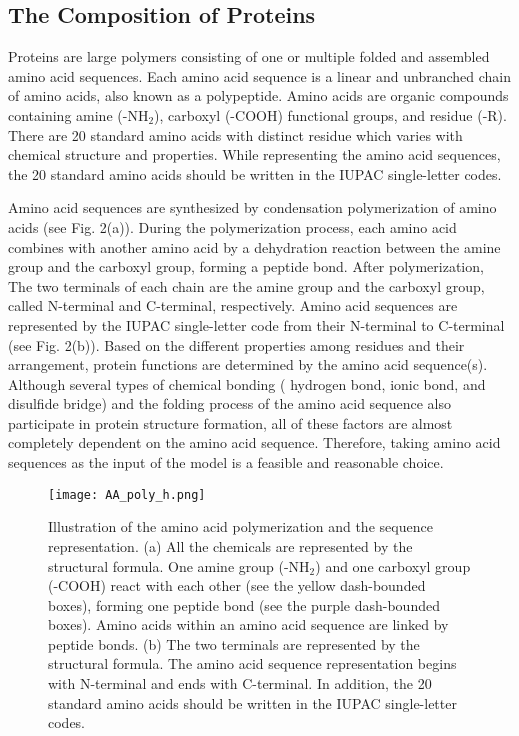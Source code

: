 \documentclass{article}
\begin{document}
    \subsection{The Composition of Proteins}
        Proteins are large polymers consisting of one or multiple folded and assembled amino acid sequences. Each amino acid sequence is a linear and unbranched chain of amino acids, also known as a polypeptide. Amino acids are organic compounds containing amine (-NH$_{2}$), carboxyl (-COOH) functional groups, and residue (-R). There are 20 standard amino acids with distinct residue which varies with chemical structure and properties. While representing the amino acid sequences, the 20 standard amino acids should be written in the IUPAC single-letter codes.  \par
        Amino acid sequences are synthesized by condensation polymerization of amino acids (see Fig. 2(a)). During the polymerization process, each amino acid combines with another amino acid by a dehydration reaction between the amine group and the carboxyl group, forming a peptide bond. After polymerization, The two terminals of each chain are the amine group and the carboxyl group, called N-terminal and C-terminal, respectively. Amino acid sequences are represented by the IUPAC single-letter code from their N-terminal to C-terminal (see Fig. 2(b)). Based on the different properties among residues and their arrangement, protein functions are determined by the amino acid sequence(s). Although several types of chemical bonding ( hydrogen bond, ionic bond, and disulfide bridge)  and the folding process of the amino acid sequence also participate in protein structure formation, all of these factors are almost completely dependent on the amino acid sequence. Therefore, taking amino acid sequences as the input of the model is a feasible and reasonable choice.
        
        \begin{figure}[h]
            \texttt{[image: AA\_poly\_h.png]}
        	\centering
        	\caption{Illustration of the amino acid polymerization and the sequence representation. (a) All the chemicals are represented by the structural formula. One amine group (-NH$_{2}$) and one carboxyl group (-COOH) react with each other (see the yellow dash-bounded boxes), forming one peptide bond (see the purple dash-bounded boxes). Amino acids within an amino acid sequence are linked by peptide bonds. (b) The two terminals are represented by the structural formula. The amino acid sequence representation begins with N-terminal and ends with  C-terminal. In addition, the 20 standard amino acids should be written in the IUPAC single-letter codes.}
        \end{figure}
\end{document}
